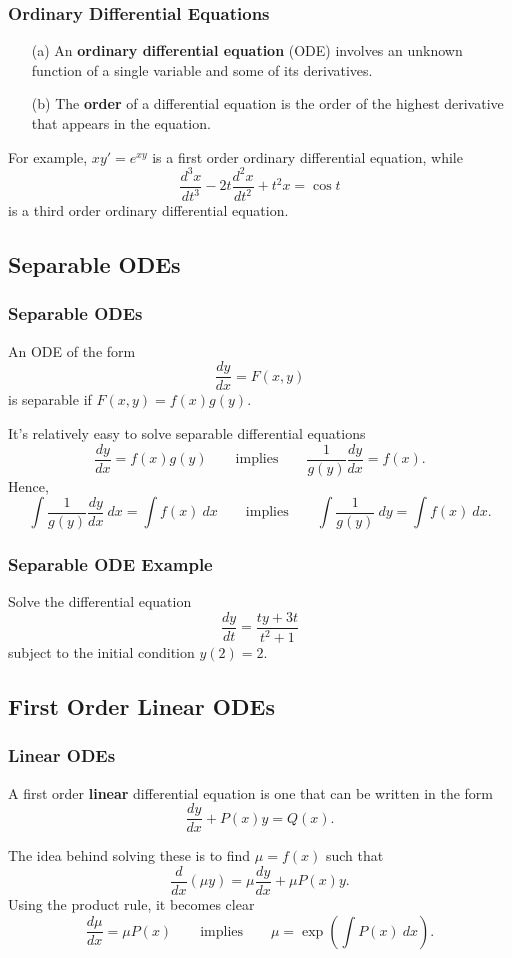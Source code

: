 \documentclass{beamer}
\begin{document}
\begin{frame}
\frametitle{Ordinary Differential Equations}

\begin{Definition}
\begin{enumerate}
\item[(a)] An {\bf ordinary differential equation} (ODE) involves an unknown function of a single variable and some of its derivatives. 
\item[(b)] The {\bf order} of a differential equation is the order of the highest derivative that appears in the equation.
\end{enumerate}
\end{Definition} 
For example, $x y' = e^{xy}$ is a first order ordinary differential equation, while
$$
\frac{d^3 x}{dt^3} - 2t\dfrac{d^2x}{dt^2} + t^2 x = \cos t
$$
is a third order ordinary differential equation.

\end{frame}

\subsection{Separable ODEs}

\begin{frame}
\frametitle{Separable ODEs}
\begin{Definition}
An ODE of the form
$$
\frac{dy}{dx} = F(x, y)
$$
is separable if $F(x, y) = f(x) g(y)$.
\end{Definition}
It's relatively easy to solve separable differential equations 
$$
\frac{dy}{dx} =  f(x) g(y)\qquad\text{implies}\qquad \frac{1}{g(y)} \frac{dy}{dx}  = f(x).
$$
Hence,
$$
\int \frac{1}{g(y)} \frac{dy}{dx}\ dx = \int f(x)\ dx\qquad\text{implies}\qquad \int \frac{1}{g(y)}\ dy = \int f(x)\ dx.
$$
\end{frame}

\begin{frame}[t]
\frametitle{Separable ODE Example}
\small
\begin{Example}
Solve the differential equation
$$
\frac{dy}{dt} = \frac{ty + 3t}{t^2 + 1}
$$
subject to the initial condition $y(2) = 2$.
\end{Example}
\end{frame}

\subsection{First Order Linear ODEs}
\begin{frame}
\frametitle{Linear ODEs}
\begin{Definition}
A first order {\bf linear} differential equation is one that can be written in the form
$$
\frac{dy}{dx} + P(x) y = Q(x).
$$
\end{Definition}
The idea behind solving these is to find $\mu = f(x)$ such that
$$
\frac{d}{dx}\left(\mu y\right) = \mu \frac{dy}{dx} + \mu P(x) y.
$$
Using the product rule, it becomes clear
$$
\frac{d\mu}{dx} = \mu P(x)\qquad\text{implies}\qquad \mu = \exp\left(\int P(x)\ dx\right).
$$
\end{frame}
\end{document}
